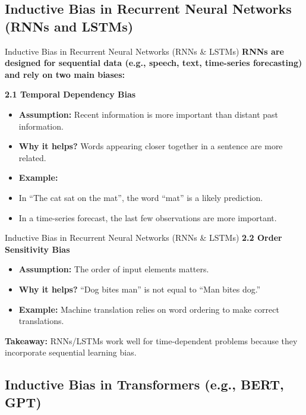 \documentclass{beamer}
\begin{document}
\subsection{Inductive Bias in Recurrent Neural Networks (RNNs and LSTMs)}

\begin{frame}{Inductive Bias in Recurrent Neural Networks (RNNs \& LSTMs)}
    \textbf{RNNs are designed for sequential data (e.g., speech, text, time-series forecasting) and rely on two main biases:}
    
    \textbf{2.1 Temporal Dependency Bias}
    \begin{itemize}
        \item \textbf{Assumption:} Recent information is more important than distant past information.
        \item \textbf{Why it helps?} Words appearing closer together in a sentence are more related.
        \item \textbf{Example:}
        \item In “The cat sat on the mat”, the word “mat” is a likely prediction.
        \item In a time-series forecast, the last few observations are more important.
    \end{itemize}
\end{frame}  
\begin{frame}{Inductive Bias in Recurrent Neural Networks (RNNs \& LSTMs)}
    \textbf{2.2 Order Sensitivity Bias}
    \begin{itemize}
        \item \textbf{Assumption:} The order of input elements matters.
        \item \textbf{Why it helps?} “Dog bites man” is not equal to “Man bites dog.”
        \item \textbf{Example:} Machine translation relies on word ordering to make correct translations.
    \end{itemize}

    \textbf{Takeaway:} RNNs/LSTMs work well for time-dependent problems because they incorporate sequential learning bias.
\end{frame}

\subsection{Inductive Bias in Transformers (e.g., BERT, GPT)}
\end{document}
